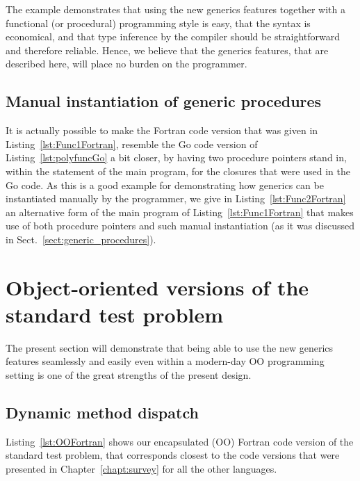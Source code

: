 \documentclass[11pt,oneside]{report}
\newcommand{\code}[1]{{\selectfont\ttfamily{#1}}}
\begin{document}
The example demonstrates that using the new generics features together
with a functional (or procedural) programming style is easy, that the
syntax is economical, and that type inference by the compiler should
be straightforward and therefore reliable. Hence, we believe that the
generics features, that are described here, will place no burden on the
programmer.


\subsection{Manual instantiation of generic procedures}

It is actually possible to make the Fortran code version that was
given in Listing~\ref{lst:Func1Fortran}, resemble the Go code version
of Listing~\ref{lst:polyfuncGo} a bit closer, by having two procedure
pointers stand in, within the \code{select case} statement of the main
program, for the closures that were used in the Go code. As this is a
good example for demonstrating how generics can be instantiated
manually by the programmer, we give in Listing~\ref{lst:Func2Fortran}
an alternative form of the main program of
Listing~\ref{lst:Func1Fortran} that makes use of both procedure
pointers and such manual instantiation (as it was discussed in
Sect.~\ref{sect:generic_procedures}).




\section{Object-oriented versions of the standard test problem}

The present section will demonstrate that being able to use the new
generics features seamlessly and easily even within a modern-day OO
programming setting is one of the great strengths of the present
design.

\subsection{Dynamic method dispatch}
\label{sect:Fortran_dynamic_dispatch}

Listing~\ref{lst:OOFortran} shows our encapsulated (OO) Fortran code
version of the standard test problem, that corresponds closest to the
code versions that were presented in Chapter~\ref{chapt:survey} for
all the other languages.
\end{document}
